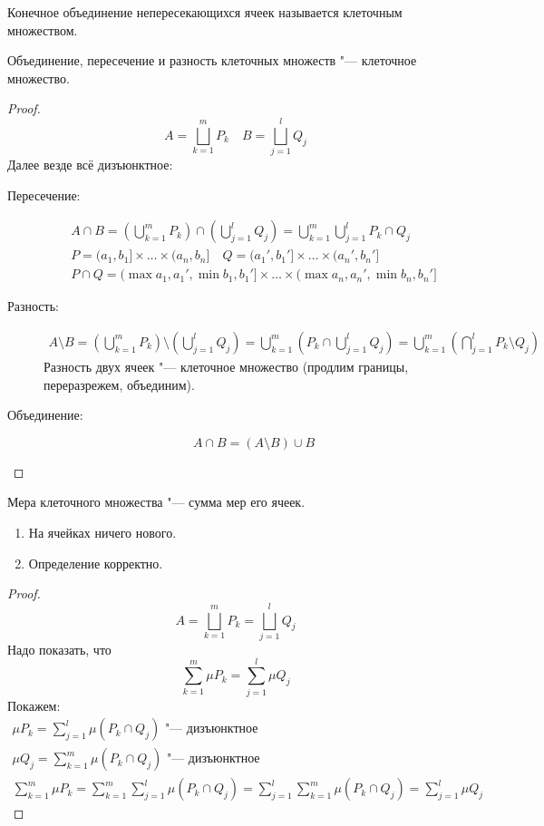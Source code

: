 \begin{Def}
	Конечное объединение непересекающихся ячеек называется клеточным множеством.
\end{Def}
\begin{lemma}
	Объединение, пересечение и разность клеточных множеств "--- клеточное множество.
\end{lemma}
\begin{proof}
	\[ A = \bigsqcup_{k=1}^m P_k \quad B = \bigsqcup_{j=1}^l Q_j \]
	Далее везде всё дизъюнктное:
	\begin{description}
	\item[Пересечение:]
		\begin{gather*}
			A \cap B = \left(\bigcup_{k=1}^m P_k\right) \cap \left(\bigcup_{j=1}^l Q_j\right)
				= \bigcup_{k=1}^m \bigcup_{j=1}^l P_k \cap Q_j \\
			P = (a_1, b_1] \times \dots \times (a_n, b_n] \quad Q = (a_1', b_1'] \times \dots \times (a_n', b_n'] \\
			P \cap Q = (\max{a_1, a_1'}, \min{b_1, b_1'}] \times \dots \times (\max{a_n, a_n'}, \min{b_n, b_n'}]
		\end{gather*}

	\item[Разность:]
		\begin{gather*}
			A \setminus B = \left(\bigcup_{k=1}^m P_k\right) \setminus \left(\bigcup_{j=1}^l Q_j\right)
				= \bigcup_{k=1}^m \left( P_k \cap \bigcup_{j=1}^l Q_j \right) = \bigcup_{k=1}^m \left( \bigcap_{j=1}^l P_k \setminus Q_j \right)
		\end{gather*}
		Разность двух ячеек "--- клеточное множество (продлим границы, переразрежем, объединим).

	\item[Объединение:]
		\[ A \cap B = (A \setminus B) \cup B \]
	\end{description}
\end{proof}

\begin{Def}
	Мера клеточного множества "--- сумма мер его ячеек.
\end{Def}
\begin{assertion}
	\begin{enumerate}
		\item На ячейках ничего нового.
		\item Определение корректно.
	\end{enumerate}
\end{assertion}
\begin{proof}
	\[ A = \bigsqcup_{k=1}^m P_k = \bigsqcup_{j=1}^l Q_j \]
	Надо показать, что
	\[ \sum_{k=1}^m \mu P_k = \sum_{j=1}^l \mu Q_j \]
	Покажем:
	\begin{gather*}
		\mu P_k = \sum_{j=1}^l \mu (P_k \cap Q_j) \text{ "--- дизъюнктное} \\
		\mu Q_j = \sum_{k=1}^m \mu (P_k \cap Q_j) \text{ "--- дизъюнктное} \\
		\sum_{k=1}^m \mu P_k = \sum_{k=1}^m \sum_{j=1}^l \mu (P_k \cap Q_j)
			= \sum_{j=1}^l \sum_{k=1}^m \mu (P_k \cap Q_j) = \sum_{j=1}^l \mu Q_j
	\end{gather*}
\end{proof}